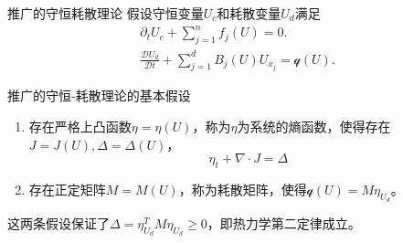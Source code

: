 \documentclass[mathserif]{beamer}
\begin{document}
\begin{frame}{推广的守恒耗散理论}
假设守恒变量$U_c$和耗散变量$U_d$满足
\begin{eqnarray*}
	\partial_t U_c + \sum_{j=1}^n f_j(U) = 0. \\
	\frac{\mathcal{D} U_d}{\mathcal{D} t} + \sum_{j=1}^d B_{j}(U)U_{x_j} = \mathcal{q}(U).
\end{eqnarray*}
\pause	
\begin{block}{推广的守恒-耗散理论的基本假设}
\begin{enumerate}
		\item 存在严格上凸函数$\eta = \eta (U)$，称为$\eta$为系统的熵函数，使得存在$J=J(U),\Delta=\Delta(U)$，
		\begin{equation*}
			\eta_t + \nabla \cdot J = \Delta
		\end{equation*}
		\item 存在正定矩阵$M = M(U)$，称为耗散矩阵，使得$\mathcal{q}(U) = M \eta_{U_d}$。
	\end{enumerate}
\end{block}
\pause	
这两条假设保证了$\Delta = \eta_{U_d}^T M \eta_{U_d} \ge 0$，即热力学第二定律成立。
\end{frame}

\end{document}

